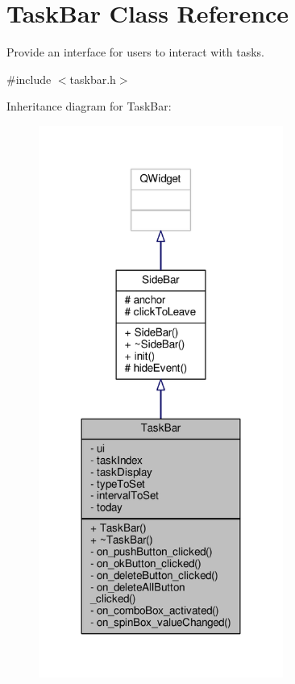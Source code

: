 \hypertarget{classTaskBar}{}\section{Task\+Bar Class Reference}
\label{classTaskBar}


Provide an interface for users to interact with tasks.  




{\ttfamily \#include $<$taskbar.\+h$>$}



Inheritance diagram for Task\+Bar\+:
\nopagebreak
\begin{figure}[H]
\begin{center}
\leavevmode
\includegraphics[width=227pt]{classTaskBar__inherit__graph}
\end{center}
\end{figure}


